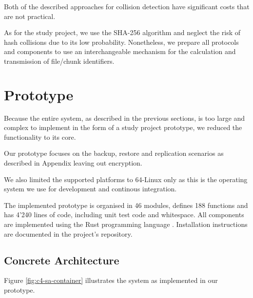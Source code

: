 Both of the described approaches for collision detection have significant costs that are not practical.

As for the study project, we use the SHA-256 algorithm\cite{sha-256} and neglect the risk of hash collisions due to its low probability. Nonetheless, we prepare all protocols and components to use an interchangeable mechanism for the calculation and transmission of file/chunk identifiers.

\section{Prototype}\label{sec:prototype}

Because the entire system, as described in the previous sections, is too large and complex to implement in the form of a study project prototype, we reduced the functionality to its core.

Our prototype focuses on the backup, restore and replication scenarios as described in Appendix  leaving out encryption.

We also limited the supported platforms to 64-Linux only as this is the operating system we use for development and continous integration.

The implemented prototype is organised in 46 modules, defines 188 functions and has 4'240 lines of code, including unit test code and whitespace. All components are implemented using the Rust programming language \cite{rustlang-org}. Installation instructions are documented in the project's repository.

\subsection{Concrete Architecture}

Figure \ref{fig:c4-sa-container} illustrates the system as implemented in our prototype.

